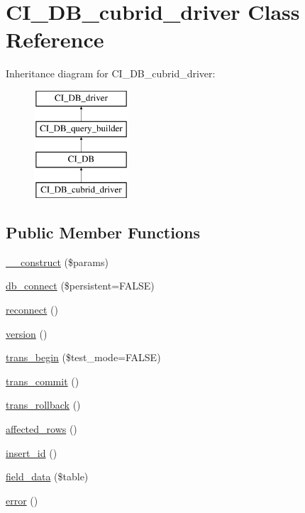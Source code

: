 \hypertarget{class_c_i___d_b__cubrid__driver}{}\section{C\+I\+\_\+\+D\+B\+\_\+cubrid\+\_\+driver Class Reference}
\label{class_c_i___d_b__cubrid__driver}
Inheritance diagram for C\+I\+\_\+\+D\+B\+\_\+cubrid\+\_\+driver\+:\begin{figure}[H]
\begin{center}
\leavevmode
\includegraphics[height=4.000000cm]{class_c_i___d_b__cubrid__driver}
\end{center}
\end{figure}
\subsection*{Public Member Functions}
\begin{DoxyCompactItemize}
\item 
\hyperlink{class_c_i___d_b__cubrid__driver_a9162320adff1a1a4afd7f2372f753a3e}{\+\_\+\+\_\+construct} (\$params)
\item 
\hyperlink{class_c_i___d_b__cubrid__driver_a52bf595e79e96cc0a7c907a9b45aeb4d}{db\+\_\+connect} (\$persistent=F\+A\+L\+S\+E)
\item 
\hyperlink{class_c_i___d_b__cubrid__driver_a57c19c642ab3023e28d10c50f86ff0a8}{reconnect} ()
\item 
\hyperlink{class_c_i___d_b__cubrid__driver_a6080dae0886626b9a4cedb29240708b1}{version} ()
\item 
\hyperlink{class_c_i___d_b__cubrid__driver_a90e153cf190d273336d77cce930587e1}{trans\+\_\+begin} (\$test\+\_\+mode=F\+A\+L\+S\+E)
\item 
\hyperlink{class_c_i___d_b__cubrid__driver_af4fbdcdace4aa94a139b64877601fe9b}{trans\+\_\+commit} ()
\item 
\hyperlink{class_c_i___d_b__cubrid__driver_a53f76d4dfcd6ac04fb653982442aeef8}{trans\+\_\+rollback} ()
\item 
\hyperlink{class_c_i___d_b__cubrid__driver_a77248aaad33eb132c04cc4aa3f4bc8cb}{affected\+\_\+rows} ()
\item 
\hyperlink{class_c_i___d_b__cubrid__driver_a933f2cde8dc7f87875e257d0a4902e99}{insert\+\_\+id} ()
\item 
\hyperlink{class_c_i___d_b__cubrid__driver_a90355121e1ed009e0efdbd544ab56efa}{field\+\_\+data} (\$table)
\item 
\hyperlink{class_c_i___d_b__cubrid__driver_a43b8d30b879d4f09ceb059b02af2bc02}{error} ()
\end{DoxyCompactItemize}
